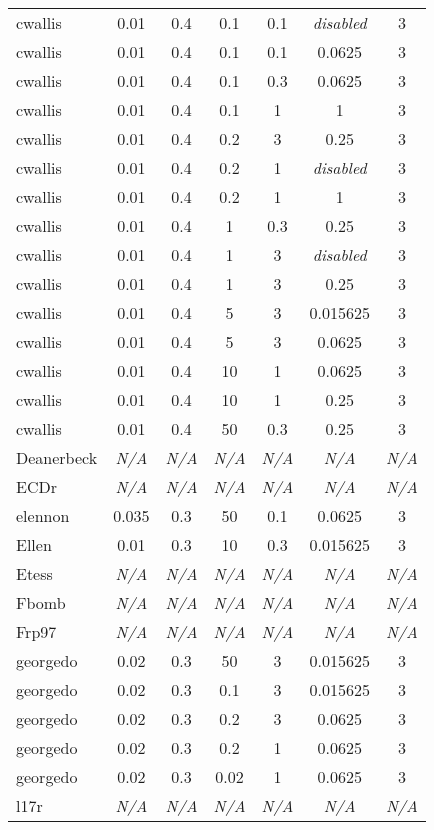 \begin{figure}[h]
\begin{tabular}{l c c c c c c}
cwallis & 0.01 & 0.4 & 0.1 & 0.1 & \emph{disabled} & 3 \\
cwallis & 0.01 & 0.4 & 0.1 & 0.1 & 0.0625 & 3 \\
cwallis & 0.01 & 0.4 & 0.1 & 0.3 & 0.0625 & 3 \\
cwallis & 0.01 & 0.4 & 0.1 & 1 & 1 & 3 \\
cwallis & 0.01 & 0.4 & 0.2 & 3 & 0.25 & 3 \\
cwallis & 0.01 & 0.4 & 0.2 & 1 & \emph{disabled} & 3 \\
cwallis & 0.01 & 0.4 & 0.2 & 1 & 1 & 3 \\
cwallis & 0.01 & 0.4 & 1 & 0.3 & 0.25 & 3 \\
cwallis & 0.01 & 0.4 & 1 & 3 & \emph{disabled} & 3 \\
cwallis & 0.01 & 0.4 & 1 & 3 & 0.25 & 3 \\
cwallis & 0.01 & 0.4 & 5 & 3 & 0.015625 & 3 \\
cwallis & 0.01 & 0.4 & 5 & 3 & 0.0625 & 3 \\
cwallis & 0.01 & 0.4 & 10 & 1 & 0.0625 & 3 \\
cwallis & 0.01 & 0.4 & 10 & 1 & 0.25 & 3 \\
cwallis & 0.01 & 0.4 & 50 & 0.3 & 0.25 & 3 \\
Deanerbeck & \emph{N/A} & \emph{N/A} & \emph{N/A} & \emph{N/A} & \emph{N/A} & \emph{N/A} \\
ECDr & \emph{N/A} & \emph{N/A} & \emph{N/A} & \emph{N/A} & \emph{N/A} & \emph{N/A} \\
elennon & 0.035 & 0.3 & 50 & 0.1 & 0.0625 & 3 \\
Ellen & 0.01 & 0.3 & 10 & 0.3 & 0.015625 & 3 \\
Etess & \emph{N/A} & \emph{N/A} & \emph{N/A} & \emph{N/A} & \emph{N/A} & \emph{N/A} \\
Fbomb & \emph{N/A} & \emph{N/A} & \emph{N/A} & \emph{N/A} & \emph{N/A} & \emph{N/A} \\
Frp97 & \emph{N/A} & \emph{N/A} & \emph{N/A} & \emph{N/A} & \emph{N/A} & \emph{N/A} \\
georgedo & 0.02 & 0.3 & 50 & 3 & 0.015625 & 3 \\
georgedo & 0.02 & 0.3 & 0.1 & 3 & 0.015625 & 3 \\
georgedo & 0.02 & 0.3 & 0.2 & 3 & 0.0625 & 3 \\
georgedo & 0.02 & 0.3 & 0.2 & 1 & 0.0625 & 3 \\
georgedo & 0.02 & 0.3 & 0.02 & 1 & 0.0625 & 3 \\
l17r & \emph{N/A} & \emph{N/A} & \emph{N/A} & \emph{N/A} & \emph{N/A} & \emph{N/A} \\

\end{tabular}
\end{figure}
